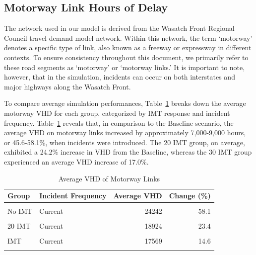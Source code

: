 \documentclass[fancy, oneside, mastersfancy, ms]{byuthesis}
\begin{document}
\hypertarget{sec-VHD-Motorway}{%
\subsection{Motorway Link Hours of Delay}\label{sec-VHD-Motorway}}

The network used in our model is derived from the Wasatch Front Regional
Council travel demand model network. Within this network, the term
`motorway' denotes a specific type of link, also known as a freeway or
expressway in different contexts. To ensure consistency throughout this
document, we primarily refer to these road segments as `motorway' or
`motorway links.' It is important to note, however, that in the
simulation, incidents can occur on both interstates and major highways
along the Wasatch Front.

To compare average simulation performances,
Table~\ref{tbl-motorway-delays-table} breaks down the average motorway
VHD for each group, categorized by IMT response and incident frequency.
Table~\ref{tbl-motorway-delays-table} reveals that, in comparison to the
Baseline scenario, the average VHD on motorway links increased by
approximately 7,000-9,000 hours, or 45.6-58.1\%, when incidents were
introduced. The 20 IMT group, on average, exhibited a 24.2\% increase in
VHD from the Baseline, whereas the 30 IMT group experienced an average
VHD increase of 17.0\%.

\hypertarget{tbl-motorway-delays-table}{}
\begin{table}
\caption{\label{tbl-motorway-delays-table}Average VHD of Motorway Links }\tabularnewline

\centering
\begin{tabular}[t]{llrr}
\toprule
\textbf{Group} & \textbf{Incident Frequency} & \textbf{Average VHD} & \textbf{Change (\%)}\\
\midrule
\cellcolor{gray!6}{Baseline} & \cellcolor{gray!6}{-} & \cellcolor{gray!6}{15335} & \cellcolor{gray!6}{0.0}\\
No IMT & Current & 24242 & 58.1\\
\cellcolor{gray!6}{No IMT} & \cellcolor{gray!6}{Increased} & \cellcolor{gray!6}{22321} & \cellcolor{gray!6}{45.6}\\
20 IMT & Current & 18924 & 23.4\\
\cellcolor{gray!6}{20 IMT} & \cellcolor{gray!6}{Increased} & \cellcolor{gray!6}{19176} & \cellcolor{gray!6}{25.0}\\
\addlinespace
30 IMT & Current & 17569 & 14.6\\
\cellcolor{gray!6}{30 IMT} & \cellcolor{gray!6}{Increased} & \cellcolor{gray!6}{18327} & \cellcolor{gray!6}{19.5}\\
\bottomrule
\end{tabular}
\end{table}
\end{document}
